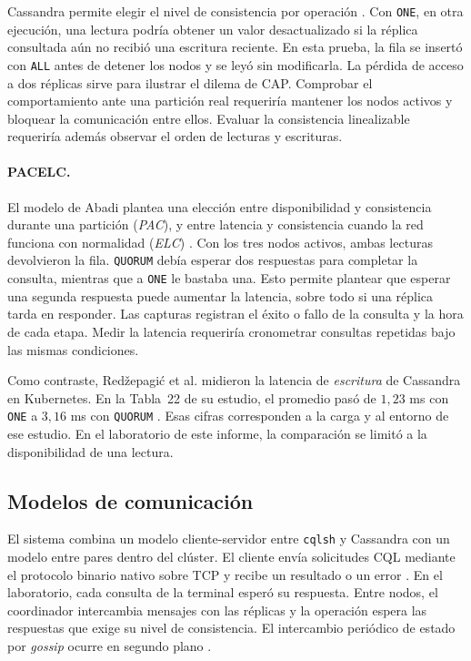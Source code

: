 \documentclass[11pt,a4paper]{article}
\begin{document}
Cassandra permite elegir el nivel de consistencia por operación \cite{cassandra5dynamo}. Con \texttt{ONE}, en otra ejecución, una lectura podría obtener un valor desactualizado si la réplica consultada aún no recibió una escritura reciente. En esta prueba, la fila se insertó con \texttt{ALL} antes de detener los nodos y se leyó sin modificarla. La pérdida de acceso a dos réplicas sirve para ilustrar el dilema de CAP. Comprobar el comportamiento ante una partición real requeriría mantener los nodos activos y bloquear la comunicación entre ellos. Evaluar la consistencia linealizable requeriría además observar el orden de lecturas y escrituras.

\paragraph{PACELC.} El modelo de Abadi plantea una elección entre disponibilidad y consistencia durante una partición (\textit{PAC}), y entre latencia y consistencia cuando la red funciona con normalidad (\textit{ELC}) \cite{abadi2012pacelc}. Con los tres nodos activos, ambas lecturas devolvieron la fila. \texttt{QUORUM} debía esperar dos respuestas para completar la consulta, mientras que a \texttt{ONE} le bastaba una. Esto permite plantear que esperar una segunda respuesta puede aumentar la latencia, sobre todo si una réplica tarda en responder. Las capturas registran el éxito o fallo de la consulta y la hora de cada etapa. Medir la latencia requeriría cronometrar consultas repetidas bajo las mismas condiciones.

Como contraste, Redžepagić et al. midieron la latencia de \emph{escritura} de Cassandra en Kubernetes. En la Tabla~22 de su estudio, el promedio pasó de \(1{,}23\) ms con \texttt{ONE} a \(3{,}16\) ms con \texttt{QUORUM} \cite{redzepagic2026kubernetes}. Esas cifras corresponden a la carga y al entorno de ese estudio. En el laboratorio de este informe, la comparación se limitó a la disponibilidad de una lectura.
\subsection{Modelos de comunicación}
El sistema combina un modelo cliente-servidor entre \texttt{cqlsh} y Cassandra con un modelo entre pares dentro del clúster. El cliente envía solicitudes CQL mediante el protocolo binario nativo sobre TCP y recibe un resultado o un error \cite{cassandra5protocol}. En el laboratorio, cada consulta de la terminal esperó su respuesta. Entre nodos, el coordinador intercambia mensajes con las réplicas y la operación espera las respuestas que exige su nivel de consistencia. El intercambio periódico de estado por \emph{gossip} ocurre en segundo plano \cite{cassandra5dynamo}.
\end{document}
